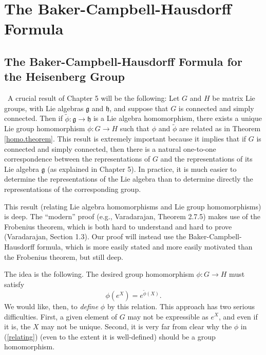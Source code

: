 \documentclass{amsbook}
\let \frak = \mathfrak
\theoremstyle{plain}
\numberwithin{equation}{chapter}
\numberwithin{theorem}{chapter}
\begin{document}
\chapter{The Baker-Campbell-Hausdorff Formula}

\section{The Baker-Campbell-Hausdorff Formula for the Heisenberg
Group\label{bch}}

\ A crucial result of Chapter 5 will be the following: Let $G$ and $H$ be
matrix Lie groups, with Lie algebras $\frak{g}$ and $\frak{h}$, and suppose
that $G$ is connected and simply connected. Then if $\widetilde{\phi}%
:\frak{g}\rightarrow\frak{h}$ is a Lie algebra homomorphism, there exists a
unique Lie group homomorphism $\phi:G\rightarrow H$ such that $\phi$ and
$\widetilde{\phi}$ are related as in Theorem \ref{homo.theorem}. This result
is extremely important because it implies that if $G$ is connected and simply
connected, then there is a natural one-to-one correspondence between the
representations of $G$ and the representations of its Lie algebra $\frak{g}$
(as explained in Chapter 5). In practice, it is much easier to determine the
representations of the Lie algebra than to determine directly the
representations of the corresponding group.

This result (relating Lie algebra homomorphisms and Lie group homomorphisms)
is deep. The ``modern'' proof (e.g., Varadarajan, Theorem 2.7.5) makes use of
the Frobenius theorem, which is both hard to understand and hard to prove
(Varadarajan, Section 1.3). Our proof will instead use the
Baker-Campbell-Hausdorff formula, which is more easily stated and more easily
motivated than the Frobenius theorem, but still deep.

The idea is the following. The desired group homomorphism $\phi:G\rightarrow
H$ must satisfy
\begin{equation}
\phi\left(  e^{X}\right)  =e^{\widetilde{\phi}(X)}\text{.}\label{relating}%
\end{equation}
We would like, then, to \textit{define} $\phi$ by this relation. This approach
has two serious difficulties. First, a given element of $G$ may not be
expressible as $e^{X}$, and even if it is, the $X$ may not be unique. Second,
it is very far from clear why the $\phi$ in (\ref{relating}) (even to the
extent it is well-defined) should be a group homomorphism.
\end{document}
